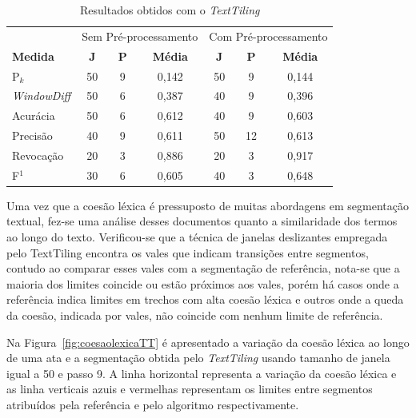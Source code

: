 \begin{table}[!h]
	\centering
	\begin{tabular}{|l||c|c|c||c|c|c|} \hline

		& \multicolumn{3}{c||}{Sem Pré-processamento} 
		& \multicolumn{3}{c|}{Com Pré-processamento}\\			

		\textbf{Medida} & 
		\textbf{J} &
		\textbf{P} & 
		\textbf{Média} &
		\textbf{J} &
		\textbf{P} & 
		\textbf{Média} \\	\hline

		P$_k$				& 50 & 9 & 0,142 & 50 & 9  & 0,144 \\ \hline
		\textit{WindowDiff}	& 50 & 6 & 0,387 & 40 & 9  & 0,396 \\ \hline
		Acurácia			& 50 & 6 & 0,612 & 40 & 9  & 0,603 \\ \hline
		Precisão			& 40 & 9 & 0,611 & 50 & 12 & 0,613 \\ \hline
		Revocação			& 20 & 3 & 0,886 & 20 & 3  & 0,917 \\ \hline
		F$^1$				& 30 & 6 & 0,605 & 40 & 3  & 0,648 \\ \hline

	\end{tabular}
	\caption{Resultados obtidos com o \textit{TextTiling}}
	\label{tab:resultadosTT}
\end{table}






Uma vez que a coesão léxica é pressuposto de muitas abordagens em segmentação textual, fez-se uma análise desses documentos quanto a similaridade dos termos ao longo do texto. Verificou-se que a técnica de janelas deslizantes empregada pelo TextTiling encontra os vales que indicam transições entre segmentos, contudo ao comparar esses vales com a segmentação de referência, nota-se que a maioria dos limites coincide  ou estão próximos aos vales, porém há casos onde a referência indica limites em trechos com alta coesão léxica e outros onde a queda da coesão, indicada por vales, não coincide com nenhum limite de referência. 



Na Figura~\ref{fig:coesaolexicaTT} é apresentado a variação da coesão léxica ao longo de uma ata e a segmentação obtida pelo \textit{TextTiling} usando tamanho de janela igual a 50 e passo 9. A linha horizontal representa a variação da coesão léxica e as linha verticais azuis e vermelhas representam os limites entre segmentos atribuídos pela referência e pelo algoritmo respectivamente. 





